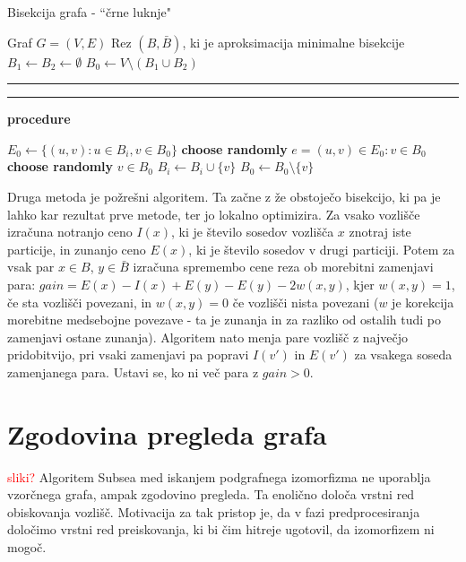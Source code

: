 \documentclass[a4paper, 12pt, ]{book}
\newcommand\Subalg[1]{%
	\Statex%
	\vspace*{-.7\baselineskip}%
	\hspace*{\dimexpr-\algorithmicindent-4pt\relax}%
	\rule{\textwidth}{0.4pt}%
	\Statex%
	
	\vspace*{-.7\baselineskip}%
	\Statex\hspace*{\dimexpr-\algorithmicindent-2pt\relax}%
	\rule{\textwidth}{0.4pt}%
	
	\Statex\hspace*{-\algorithmicindent}\textbf{procedure} #1%
}
\newcommand{\TODO}[1]{\textcolor{red}{#1}}
\begin{document}
\begin{algorithm}
\caption{Bisekcija grafa - ``črne luknje"}
\label{alg:sub_bh}
\begin{algorithmic}[1]
	\Require Graf $G = (V, E)$
	\Ensure Rez $(B, \bar B)$, ki je aproksimacija minimalne bisekcije
	\State $B_1 \gets B_2 \gets \emptyset$
	\State $B_0 \gets V \setminus (B_1 \cup B_2)$
	\Repeat
		\State {}
		\State {}
	
	\Subalg{}

	 \Return \EndIf
	\State $E_0 \gets \{ (u,v): u \in B_i, v \in B_0 \}$
		\State \textbf{choose randomly} $e = (u,v) \in E_0: v \in B_0$
	\Else
		\State \textbf{choose randomly} $v \in B_0$
	\EndIf
	\State $B_i \gets B_i \cup \{ v \}$
	\State $B_0 \gets B_0 \setminus \{ v \}$
\end{algorithmic}
\end{algorithm}

	Druga metoda je požrešni algoritem. Ta začne z že obstoječo bisekcijo, ki pa je lahko kar rezultat prve metode, ter jo lokalno optimizira. Za vsako vozlišče
	izračuna notranjo ceno $I(x)$, ki je število sosedov vozlišča $x$ znotraj iste particije, in zunanjo ceno $E(x)$, ki je število sosedov v drugi particiji. Potem
	za vsak par $x \in B$, $y \in \bar B$ izračuna spremembo cene reza ob morebitni zamenjavi para: $gain = E(x) - I(x) + E(y)  - E(y) - 2w(x,y)$, kjer
	$w(x,y) = 1$, če sta vozlišči povezani, in $w(x,y) = 0$ če vozlišči nista povezani ($w$ je korekcija morebitne medsebojne povezave - ta je zunanja in za
	razliko od ostalih tudi po zamenjavi ostane zunanja). Algoritem nato menja pare vozlišč z največjo pridobitvijo, pri vsaki zamenjavi pa popravi $I(v')$ 
	in $E(v')$ za vsakega soseda zamenjanega para. Ustavi se, ko ni več para z $gain > 0$.
	
	
	
	\section{Zgodovina pregleda grafa}
	\label{sub:th}
	\TODO{sliki?}
	Algoritem Subsea med iskanjem podgrafnega izomorfizma ne uporablja vzorčnega grafa, ampak zgodovino pregleda. Ta enolično določa vrstni red
	obiskovanja vozlišč. Motivacija za tak pristop je, da v fazi predprocesiranja določimo vrstni red preiskovanja, ki bi čim hitreje ugotovil, da izomorfizem
	ni mogoč.
	
\end{document}
